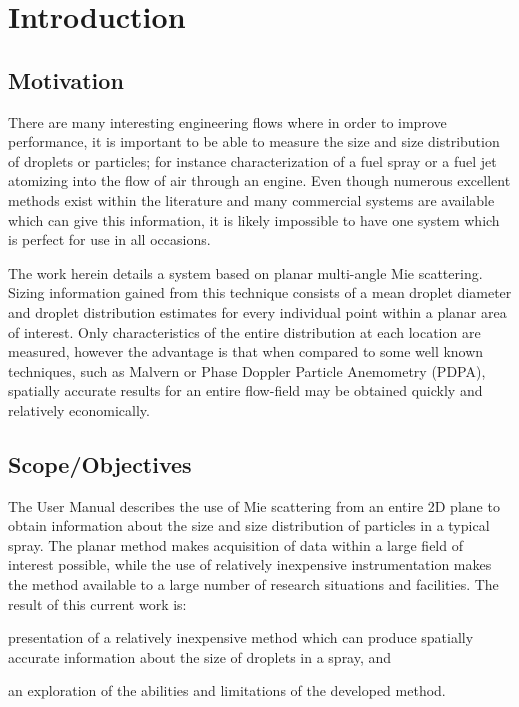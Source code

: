 \chapter{Introduction}
\section{Motivation}

There are many interesting engineering flows where in order to improve performance, it is important to be able to measure the size and size distribution of droplets or particles; for instance characterization of a fuel spray or a fuel jet atomizing into the flow of air through an engine.  Even though numerous excellent methods exist within the literature and many commercial systems are available which can give this information, it is likely impossible to have one system which is perfect for use in all occasions.

The work herein details a system based on planar multi-angle Mie scattering.  Sizing information gained from this technique consists of a mean droplet diameter and droplet distribution estimates for every individual point within a planar area of interest.  Only characteristics of the entire distribution at each location are measured, however the advantage is that when compared to some well known techniques, such as Malvern or Phase Doppler Particle Anemometry (PDPA), spatially accurate results for an entire flow-field may be obtained quickly and relatively economically.

\section{Scope/Objectives}

The User Manual describes the use of Mie scattering from an entire 2D plane to obtain information about the size and size distribution of particles in a typical spray.  The planar method makes acquisition of data within a large field of interest possible, while the use of relatively inexpensive instrumentation makes the method available to a large number of research situations and facilities.  
\newpage
The result of this current work is:
\begin{compactitem}
\item presentation of a relatively inexpensive method which can produce spatially accurate information about the size of droplets in a spray, and
\item an exploration of the abilities and limitations of the developed method.  
\end{compactitem}
\vspace*{0.15in}

